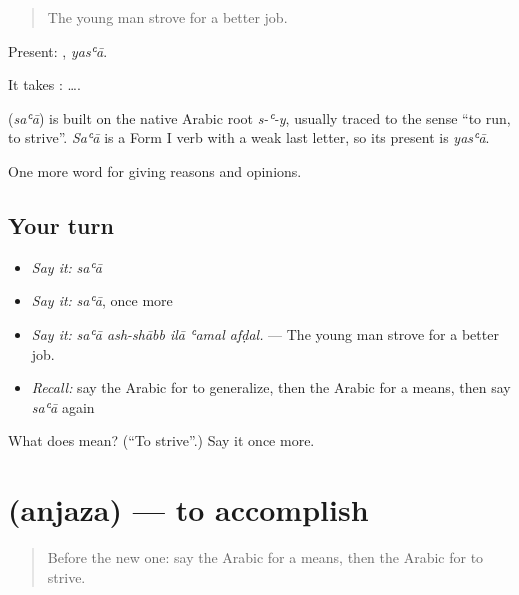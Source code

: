 \begin{quote}
The young man strove for a better job.
\end{quote}

Present: , \emph{yasʿā}.

It takes :   ….

\begin{cousinweb}
\textbf{} (\emph{saʿā}) is built on the native Arabic root \emph{s-ʿ-y}, usually traced to the sense \textquotedblleft{}to run, to strive\textquotedblright{}. \emph{Saʿā} is a Form I verb with a weak last letter, so its present is \emph{yasʿā}.
\end{cousinweb}

\begin{grammarlens}[title={What you've built}]
One more word for giving reasons and opinions.
\end{grammarlens}

\subsection*{Your turn}
\begin{itemize}
\raggedright
  \item \emph{Say it:} \emph{saʿā}
  \item \emph{Say it:} \emph{saʿā}, once more
  \item \emph{Say it:} \emph{saʿā ash-shābb ilā ʿamal afḍal.} — The young man strove for a better job.
  \item \emph{Recall:} say the Arabic for to generalize, then the Arabic for a means, then say \emph{saʿā} again
\end{itemize}

\begin{tcolorbox}[breakable,colback=teal!4,colframe=teal!35!black,title={Before you move on}]
What does  mean? (\textquotedblleft{}To strive\textquotedblright{}.) Say it once more.
\end{tcolorbox}
\section[\texorpdfstring{\ar{أنجز} (anjaza)}{أنجز (anjaza)}]{ (anjaza) — to accomplish}

\label{lesson:AR-C371-anjaza}



\begin{quote}
Before the new one: say the Arabic for a means, then the Arabic for to strive.
\end{quote}

